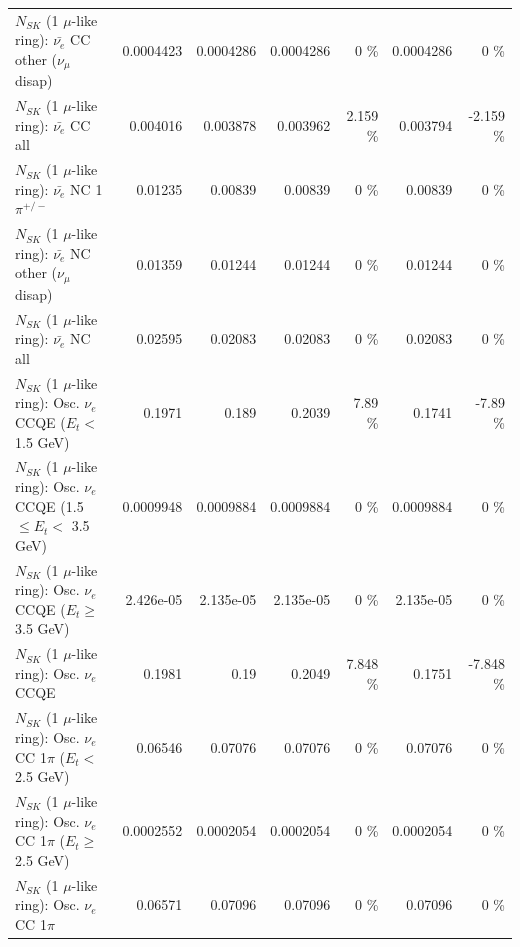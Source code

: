\begin{table}
\begin{tabular}{| l | r | r | r  r | r  r |}
          $N_{SK}$ (1 $\mu$-like ring): $\bar{\nu_e}$ CC other ($\nu_\mu$ disap) &       0.0004423 &       0.0004286 &       0.0004286 &        0 \%  &       0.0004286 &        0 \%  \\ 
                            $N_{SK}$ (1 $\mu$-like ring): $\bar{\nu_{e}}$ CC all &        0.004016 &        0.003878 &        0.003962 &    2.159 \%  &        0.003794 &   -2.159 \%  \\ 
\hline
                     $N_{SK}$ (1 $\mu$-like ring): $\bar{\nu_e}$ NC 1$\pi^{+/-}$ &         0.01235 &         0.00839 &         0.00839 &        0 \%  &         0.00839 &        0 \%  \\ 
          $N_{SK}$ (1 $\mu$-like ring): $\bar{\nu_e}$ NC other ($\nu_\mu$ disap) &         0.01359 &         0.01244 &         0.01244 &        0 \%  &         0.01244 &        0 \%  \\ 
                            $N_{SK}$ (1 $\mu$-like ring): $\bar{\nu_{e}}$ NC all &         0.02595 &         0.02083 &         0.02083 &        0 \%  &         0.02083 &        0 \%  \\ 
\hline
\hline
\hline
             $N_{SK}$ (1 $\mu$-like ring): Osc. $\nu_e$ CCQE ($E_{t} <$ 1.5 GeV) &          0.1971 &           0.189 &          0.2039 &     7.89 \%  &          0.1741 &    -7.89 \%  \\ 
    $N_{SK}$ (1 $\mu$-like ring): Osc. $\nu_e$ CCQE (1.5 $\leq E_{t} <$ 3.5 GeV) &       0.0009948 &       0.0009884 &       0.0009884 &        0 \%  &       0.0009884 &        0 \%  \\ 
          $N_{SK}$ (1 $\mu$-like ring): Osc. $\nu_e$ CCQE ($E_{t} \geq$ 3.5 GeV) &       2.426e-05 &       2.135e-05 &       2.135e-05 &        0 \%  &       2.135e-05 &        0 \%  \\ 
\hline
                                 $N_{SK}$ (1 $\mu$-like ring): Osc. $\nu_e$ CCQE &          0.1981 &            0.19 &          0.2049 &    7.848 \%  &          0.1751 &   -7.848 \%  \\ 
\hline
        $N_{SK}$ (1 $\mu$-like ring): Osc. $\nu_e$ CC 1$\pi$ ($E_{t} <$ 2.5 GeV) &         0.06546 &         0.07076 &         0.07076 &        0 \%  &         0.07076 &        0 \%  \\ 
     $N_{SK}$ (1 $\mu$-like ring): Osc. $\nu_e$ CC 1$\pi$ ($E_{t} \geq$ 2.5 GeV) &       0.0002552 &       0.0002054 &       0.0002054 &        0 \%  &       0.0002054 &        0 \%  \\ 
\hline
                            $N_{SK}$ (1 $\mu$-like ring): Osc. $\nu_e$ CC 1$\pi$ &         0.06571 &         0.07096 &         0.07096 &        0 \%  &         0.07096 &        0 \%  \\ 

\end{tabular}
\end{table}
